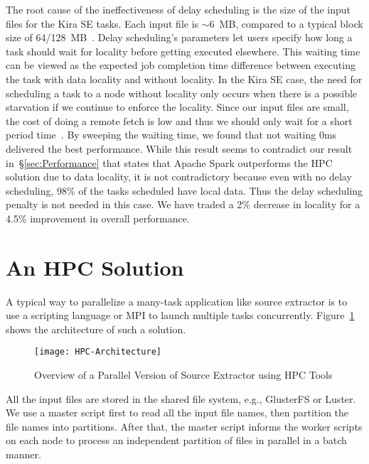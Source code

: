 \documentclass[conference]{IEEEtran}
\begin{document}
The root cause of the ineffectiveness of delay scheduling is the size of the input files for the Kira SE tasks. 
Each input file is $\sim$6~MB, compared to a typical block size of 64/128~MB~\cite{shvachko10}.
Delay scheduling's parameters let users specify how long a task should wait for locality before getting executed elsewhere.
This waiting time can be viewed as the expected job completion time difference between executing the task with data locality and without locality.
In the Kira SE case, the need for scheduling a task to a node without locality only occurs when there is a possible
starvation if we continue to enforce the locality. Since our input files are small, the cost of doing a remote fetch is low and thus we should only
wait for a short period time~\cite{ananthanarayanan11}. By sweeping the waiting time, we found that not waiting 0ms delivered the best performance.
While this result seems to contradict our result in~\S\ref{sec:Performance} that states that Apache Spark outperforms
the HPC solution due to data locality, it is not contradictory because even with no delay scheduling, 
98\% of the tasks scheduled have local data.  Thus the delay scheduling penalty is not needed in this case.   
We have traded a 2\% decrease in locality for a 4.5\% improvement in overall performance.

\section{An HPC Solution}
\label{sec:HPC}
A typical way to parallelize a many-task application like source extractor is to use a scripting language
or MPI to launch multiple tasks concurrently. Figure~\ref{fig:hpc-architecture} shows the architecture
of such a solution.

\begin{figure}[t]
	\begin{center}
		\texttt{[image: HPC-Architecture]}
		\caption{Overview of a Parallel Version of Source Extractor using HPC Tools}
		\label{fig:hpc-architecture}
  	\end{center}
\end{figure}

All the input files are stored in the shared file system, e.g., GlusterFS or Luster. We use a master script
first to read all the input file names, then partition the file names into partitions. After that, the master
script informs the worker scripts on each node to process an independent partition of files in parallel 
in a batch manner.
\end{document}
